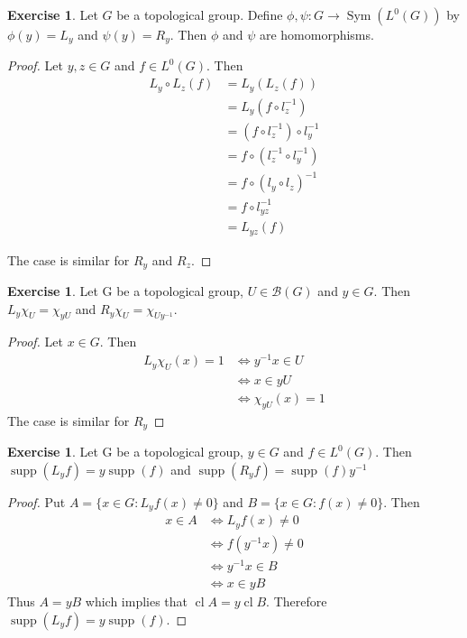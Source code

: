 \documentclass[12pt]{amsart}
\theoremstyle{definition}
\newtheorem{ex}[definition]{Exercise}
\newcommand{\MB}{\mathcal{B}}
\DeclareMathOperator{\supp}{supp}
\DeclareMathOperator{\Sym}{Sym}
\DeclareMathOperator{\cl}{cl}
\DeclareMathOperator*{\0}{\mbf{0}}
\DeclareMathOperator*{\1}{\mbf{1}}
\newcommand{\lex}[1]{\label{ex:#1}}
\begin{document}
	\begin{ex} \lex{00000} 
	Let $G$ be a topological group. Define $\phi, \psi: G \rightarrow \Sym(L^0(G))$ by $\phi(y) = L_y$ and $\psi(y) = R_y$. Then $\phi$ and $\psi$ are homomorphisms.
	\end{ex}

	\begin{proof}
		Let $y,z \in G$ and $f \in L^0(G)$. Then 
		\begin{align*}
			L_y \circ L_z(f)
			& = L_y (L_z (f))  \\
			& = L_y (f \circ l_z^{-1})  \\
			& = (f \circ l_z^{-1}) \circ l_y^{-1} \\
			&= f \circ (l_z^{-1} \circ l_y^{-1}) \\
			& = f \circ (l_y \circ l_z)^{-1}  \\
			& = f \circ l_{yz}^{-1} \\
			&= L_{yz} (f)
		\end{align*}
		
		The case is similar for $R_y$ and $ R_z$.
	\end{proof}
	
	\begin{ex} \lex{00000} 
		Let G be a topological group, $U \in \MB(G)$ and $y \in G$. Then $L_y\chi_U = \chi_{yU}$ and $R_y\chi_U = \chi_{Uy^{-1}}$. 
	\end{ex}
	
	\begin{proof}
		Let $x \in G$. Then 
		\begin{align*}
			L_y\chi_U(x) = 1
			& \iff y^{-1}x \in U\\
			& \iff x \in yU \\
			& \iff \chi_{yU}(x) = 1
		\end{align*}
		The case is similar for $R_y$
	\end{proof}
	
	\begin{ex} \lex{00000} 
		Let G be a topological group, $y \in G$ and $f \in L^0(G)$. Then $\supp(L_yf) = y\supp(f)$ and $\supp(R_yf) = \supp(f)y^{-1}$
	\end{ex}
	
	\begin{proof}
		Put $A = \{x \in G: L_yf(x) \neq 0 \}$ and $B = \{x \in G: f(x) \neq 0 \}$. Then 
		\begin{align*}
			x \in A
			& \iff L_yf(x) \neq 0 \\
			& \iff f(y^{-1}x) \neq 0 \\
			& \iff y^{-1}x \in B \\
			& \iff x \in yB
		\end{align*}
		Thus $A = yB$ which implies that $\cl A = y \cl B$. Therefore $\supp(L_yf) = y\supp(f)$.
	\end{proof}
	
\end{document}
